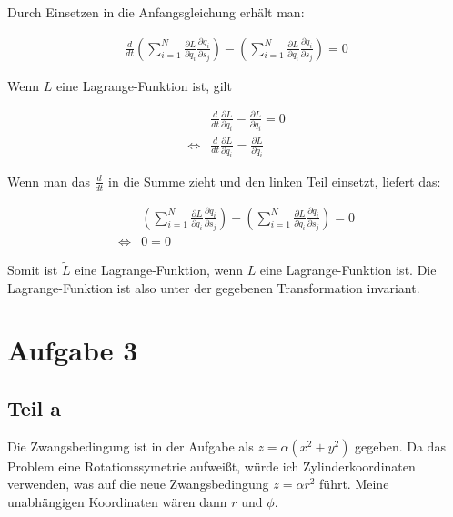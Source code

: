 \documentclass[a4paper,german,12pt,smallheadings]{scrartcl}
\begin{document}
Durch Einsetzen in die Anfangsgleichung erhält man:

\begin{align*}
\frac{d}{dt} \left(
  \sum_{i=1}^N \frac{\partial L}{\partial \dot{q}_i} \frac{\partial q_i}{\partial s_j}
\right) - \left(
  \sum_{i=1}^N \frac{\partial L}{\partial q_i} \frac{\partial q_i}{\partial s_j}
\right) = 0
\end{align*}

Wenn $L$ eine Lagrange-Funktion ist, gilt

\begin{align*}
  &\frac{d}{dt}\frac{\partial L}{\partial \dot{q}_i} - \frac{\partial L}{\partial q_i} = 0 \\
  \Leftrightarrow &\frac{d}{dt}\frac{\partial L}{\partial \dot{q}_i} = \frac{\partial L}{\partial q_i}
\end{align*}

Wenn man das $\frac{d}{dt}$ in die Summe zieht und den linken Teil einsetzt, liefert das:

\begin{align*}
&\left(
  \sum_{i=1}^N \frac{\partial L}{\partial q_i} \frac{\partial q_i}{\partial s_j}
\right) - \left(
  \sum_{i=1}^N \frac{\partial L}{\partial q_i} \frac{\partial q_i}{\partial s_j}
\right) = 0 \\
\Leftrightarrow &0 = 0
\end{align*}

Somit ist $\tilde{L}$ eine Lagrange-Funktion, wenn $L$ eine Lagrange-Funktion
ist. Die Lagrange-Funktion ist also unter der gegebenen Transformation
invariant.

\section*{Aufgabe 3}
\subsection*{Teil a}

Die Zwangsbedingung ist in der Aufgabe als $z = \alpha (x^2+y^2)$ gegeben. Da
das Problem eine Rotationssymetrie aufweißt, würde ich Zylinderkoordinaten
verwenden, was auf die neue Zwangsbedingung $z = \alpha r^2$ führt. Meine
unabhängigen Koordinaten wären dann $r$ und $\phi$.
\end{document}

